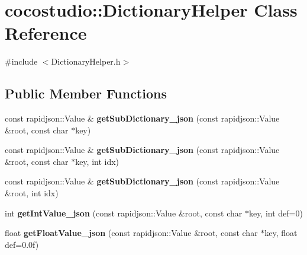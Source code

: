 \hypertarget{classcocostudio_1_1DictionaryHelper}{}\section{cocostudio\+:\+:Dictionary\+Helper Class Reference}
\label{classcocostudio_1_1DictionaryHelper}


{\ttfamily \#include $<$Dictionary\+Helper.\+h$>$}

\subsection*{Public Member Functions}
\begin{DoxyCompactItemize}
\item 
\mbox{\label{classcocostudio_1_1DictionaryHelper_a1dbc34f1733b95c64618848e7f0d288c}} 
const rapidjson\+::\+Value \& {\bfseries get\+Sub\+Dictionary\+\_\+json} (const rapidjson\+::\+Value \&root, const char $\ast$key)
\item 
\mbox{\label{classcocostudio_1_1DictionaryHelper_ad0c24b0c60af6d692a843a31ad2f72ab}} 
const rapidjson\+::\+Value \& {\bfseries get\+Sub\+Dictionary\+\_\+json} (const rapidjson\+::\+Value \&root, const char $\ast$key, int idx)
\item 
\mbox{\label{classcocostudio_1_1DictionaryHelper_af6009326f1d967268ff3d6174bff57e6}} 
const rapidjson\+::\+Value \& {\bfseries get\+Sub\+Dictionary\+\_\+json} (const rapidjson\+::\+Value \&root, int idx)
\item 
\mbox{\label{classcocostudio_1_1DictionaryHelper_ae84b0e5fb2b56e9f512891f48073a263}} 
int {\bfseries get\+Int\+Value\+\_\+json} (const rapidjson\+::\+Value \&root, const char $\ast$key, int def=0)
\item 
\mbox{\label{classcocostudio_1_1DictionaryHelper_a4ebbb4cdc7953d4e243d846fac298247}} 
float {\bfseries get\+Float\+Value\+\_\+json} (const rapidjson\+::\+Value \&root, const char $\ast$key, float def=0.\+0f)
\item 
\mbox{\label{classcocostudio_1_1DictionaryHelper_a381c2d9dfc9c3048034751c8559ec871}} 

\end{DoxyCompactItemize}
